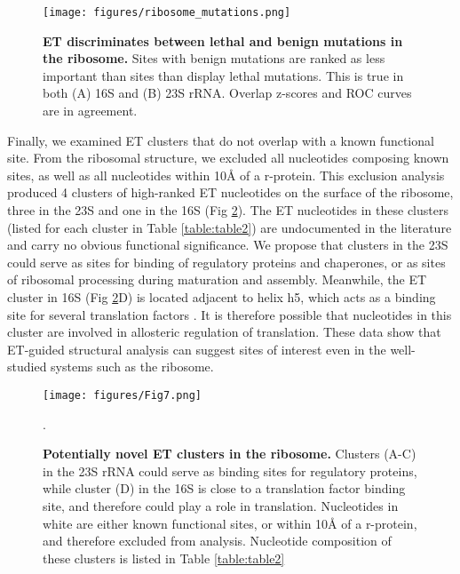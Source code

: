 \documentclass[12pt,a4paper]{report}
\begin{document}
\begin{figure}
\begin{minipage}[c][\textheight]{\textwidth}
\centering
 \vspace{-1in}
  \texttt{[image: figures/ribosome\_mutations.png]}
\caption[ET discriminates between lethal and benign mutations in the ribosome.]{\textbf{ET discriminates between lethal and benign mutations in the ribosome.} Sites with benign mutations are ranked as less important than sites than display lethal mutations. This is true in both (A) 16S and (B) 23S rRNA. Overlap z-scores and ROC curves are in agreement.}
\label{fig:ribosome_mutations}
\end{minipage}
\end{figure}

Finally, we examined ET clusters that do not overlap with a known functional site. From the ribosomal structure, we excluded all nucleotides composing known sites, as well as all nucleotides within 10Å of a r-protein. This exclusion analysis produced 4 clusters of high-ranked ET nucleotides on the surface of the ribosome, three in the 23S and one in the 16S (Fig \ref{fig:ribosome_novel}). The ET nucleotides in these clusters (listed for each cluster in Table \ref{table:table2}) are undocumented in the literature and carry no obvious functional significance. We propose that clusters in the 23S could serve as sites for binding of regulatory proteins and chaperones, or as sites of ribosomal processing during maturation and assembly. Meanwhile, the ET cluster in 16S (Fig \ref{fig:ribosome_novel}D) is located adjacent to helix h5, which acts as a binding site for several translation factors \cite{Klaholz2004, Julian2011}. It is therefore possible that nucleotides in this cluster are involved in allosteric regulation of translation. These data show that ET-guided structural analysis can suggest sites of interest even in the well-studied systems such as the ribosome.

\begin{figure}
\begin{minipage}[c][\textheight]{\textwidth}
\centering
\vspace{-3in}
  \texttt{[image: figures/Fig7.png]}
  \caption[Potentially novel ET clusters in the ribosome.]{\textbf{Potentially novel ET clusters in the ribosome.} Clusters (A-C) in the 23S rRNA could serve as binding sites for regulatory proteins, while cluster (D) in the 16S is close to a translation factor binding site, and therefore could play a role in translation. Nucleotides in white are either known functional sites, or within 10Å of a r-protein, and therefore excluded from analysis. Nucleotide composition of these clusters is listed in Table \ref{table:table2}}.
  \label{fig:ribosome_novel}
  \end{minipage}
\end{figure}
\end{document}
